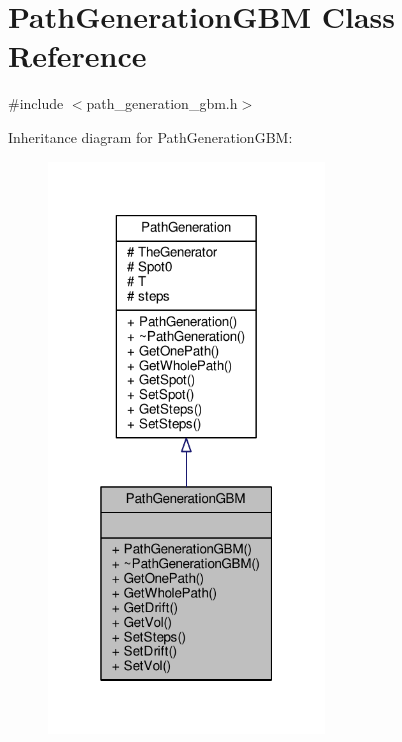 \hypertarget{classPathGenerationGBM}{}\section{Path\+Generation\+G\+BM Class Reference}
\label{classPathGenerationGBM}


{\ttfamily \#include $<$path\+\_\+generation\+\_\+gbm.\+h$>$}



Inheritance diagram for Path\+Generation\+G\+BM\+:
\nopagebreak
\begin{figure}[H]
\begin{center}
\leavevmode
\includegraphics[width=208pt]{classPathGenerationGBM__inherit__graph}
\end{center}
\end{figure}


